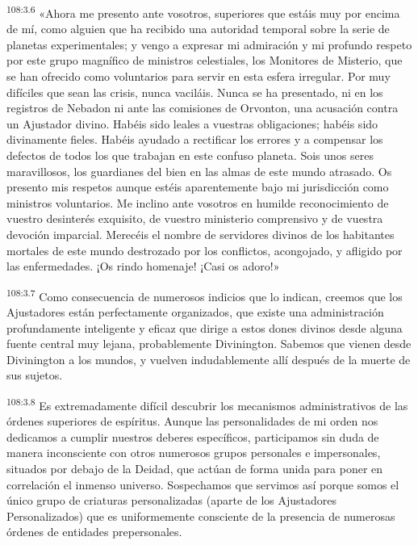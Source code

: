 \par
\textsuperscript{108:3.6} «Ahora me presento ante vosotros, superiores que estáis muy por encima de mí, como alguien que ha recibido una autoridad temporal sobre la serie de planetas experimentales; y vengo a expresar mi admiración y mi profundo respeto por este grupo magnífico de ministros celestiales, los Monitores de Misterio, que se han ofrecido como voluntarios para servir en esta esfera irregular. Por muy difíciles que sean las crisis, nunca vaciláis. Nunca se ha presentado, ni en los registros de Nebadon ni ante las comisiones de Orvonton, una acusación contra un Ajustador divino. Habéis sido leales a vuestras obligaciones; habéis sido divinamente fieles. Habéis ayudado a rectificar los errores y a compensar los defectos de todos los que trabajan en este confuso planeta. Sois unos seres maravillosos, los guardianes del bien en las almas de este mundo atrasado. Os presento mis respetos aunque estéis aparentemente bajo mi jurisdicción como ministros voluntarios. Me inclino ante vosotros en humilde reconocimiento de vuestro desinterés exquisito, de vuestro ministerio comprensivo y de vuestra devoción imparcial. Merecéis el nombre de servidores divinos de los habitantes mortales de este mundo destrozado por los conflictos, acongojado, y afligido por las enfermedades. ¡Os rindo homenaje! ¡Casi os adoro!»

\par
\textsuperscript{108:3.7} Como consecuencia de numerosos indicios que lo indican, creemos que los Ajustadores están perfectamente organizados, que existe una administración profundamente inteligente y eficaz que dirige a estos dones divinos desde alguna fuente central muy lejana, probablemente Divinington. Sabemos que vienen desde Divinington a los mundos, y vuelven indudablemente allí después de la muerte de sus sujetos.

\par
\textsuperscript{108:3.8} Es extremadamente difícil descubrir los mecanismos administrativos de las órdenes superiores de espíritus. Aunque las personalidades de mi orden nos dedicamos a cumplir nuestros deberes específicos, participamos sin duda de manera inconsciente con otros numerosos grupos personales e impersonales, situados por debajo de la Deidad, que actúan de forma unida para poner en correlación el inmenso universo. Sospechamos que servimos así porque somos el único grupo de criaturas personalizadas (aparte de los Ajustadores Personalizados) que es uniformemente consciente de la presencia de numerosas órdenes de entidades prepersonales.


